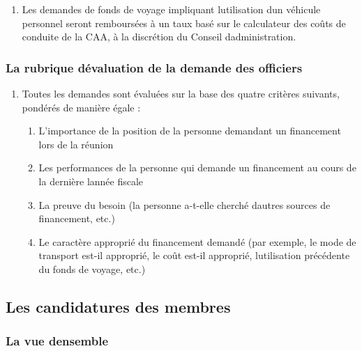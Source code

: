 \begin{enumerate}
 \item
  Les demandes de fonds de voyage impliquant l\textquotesingle utilisation d\textquotesingle un véhicule personnel seront remboursées à un taux basé sur le calculateur des coûts de conduite de la CAA, à la discrétion du Conseil d\textquotesingle administration.
\end{enumerate}

\subsubsection{La rubrique d\textquotesingle évaluation de la demande des officiers}
\label{la-rubrique-d-evaluation-de-la-demande-des-officiers}

\begin{enumerate}
 \item
  Toutes les demandes sont évaluées sur la base des quatre critères suivants, pondérés de manière égale :

  \begin{enumerate}
   \item
    L'importance de la position de la personne demandant un financement lors de la réunion
   \item
    Les performances de la personne qui demande un financement au cours de la dernière l\textquotesingle année fiscale
   \item
    La preuve du besoin (la personne a-t-elle cherché d\textquotesingle autres sources de financement, etc.)
   \item
    Le caractère approprié du financement demandé (par exemple, le mode de transport est-il approprié, le coût est-il approprié, l\textquotesingle utilisation précédente du fonds de voyage, etc.)
  \end{enumerate}
\end{enumerate}

\subsection{Les candidatures des membres}
\label{les-candidatures-des-membres}

\subsubsection{La vue d\textquotesingle ensemble}
\label{la-vue-densemble-3}


